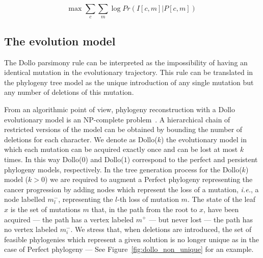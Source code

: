 \documentclass[a4paper,USenglish]{article}
\newcommand{\ie}{\emph{i.e.}}
\theoremstyle{definition}
\begin{document}
\begin{equation}
  \label{eq:log-likelihood}
  \mbox{max } \sum_c \sum_m \log Pr\left( I[c,m] | P[c,m]\right)
\end{equation}

\subsection{The evolution model}
\label{sec:intro_dollok}

The Dollo parsimony rule can be interpreted as the impossibility of
having an identical mutation in the evolutionary trajectory.  This
rule can be translated in the phylogeny tree model as the unique
introduction of any single mutation but any number of deletions of
this mutation.

From an algorithmic point of view, phylogeny reconstruction with a
Dollo evolutionary model is an NP-complete
problem~\cite{BKW95,DAY198633}.  A hierarchical chain of restricted
versions of the model can be obtained by bounding the number of
deletions for each character.  We denote as Dollo($k$) the
evolutionary model in which each mutation can be acquired exactly once
and can be lost at most $k$ times.  In this way Dollo($0$) and
Dollo($1$) correspond to the perfect and persistent phylogeny models,
respectively.  In the tree generation process for the Dollo($k$) model
($k>0$) we are required to augment a Perfect phylogeny representing
the cancer progression by adding nodes which represent the loss of a
mutation, \ie, a node labelled $m^-_l$, representing the $l$-th loss
of mutation $m$.  The state of the leaf $x$ is the set of mutations
$m$ that, in the path from the root to $x$, have been acquired --- the
path has a vertex labeled $m^{+}$ --- but never lost --- the path has
no vertex labeled $m_{i}^{-}$.  We stress that, when deletions are
introduced, the set of feasible phylogenies which represent a given
solution is no longer unique as in the case of Perfect phylogeny ---
See Figure~\ref{fig:dollo_non_unique} for an example.
\end{document}
